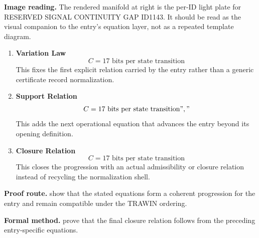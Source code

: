 \begin{samepage}
\noindent\begin{minipage}[t]{0.45\linewidth}
\vspace{0pt}
\raggedright
\scriptsize\textbf{Image reading.} The rendered manifold at right is the per-ID light plate for RESERVED SIGNAL CONTINUITY GAP ID1143. It should be read as the visual companion to the entry's equation layer, not as a repeated template diagram.\par
\end{minipage}\hfill
\begin{minipage}[t]{0.53\linewidth}
\vspace*{-0.10in}
\raggedright
{}
\end{minipage}
\end{samepage}

\clearpage


\begin{enumerate}[leftmargin=1.6em,itemsep=9pt,topsep=6pt]
\item \textbf{Variation Law}
\[
C = 17 \text{ bits per state transition}
\]
This fixes the first explicit relation carried by the entry rather than a generic certificate record normalization.

\item \textbf{Support Relation}
\[
C = 17 \text{ bits per state transition}","
\]
This adds the next operational equation that advances the entry beyond its opening definition.

\item \textbf{Closure Relation}
\[
C = 17 \text{ bits per state transition}
\]
This closes the progression with an actual admissibility or closure relation instead of recycling the normalization shell.
\end{enumerate}

\textbf{Proof route.} show that the stated equations form a coherent progression for the entry and remain compatible under the TRAWIN ordering.

\textbf{Formal method.} prove that the final closure relation follows from the preceding entry-specific equations.

\medskip
{}

